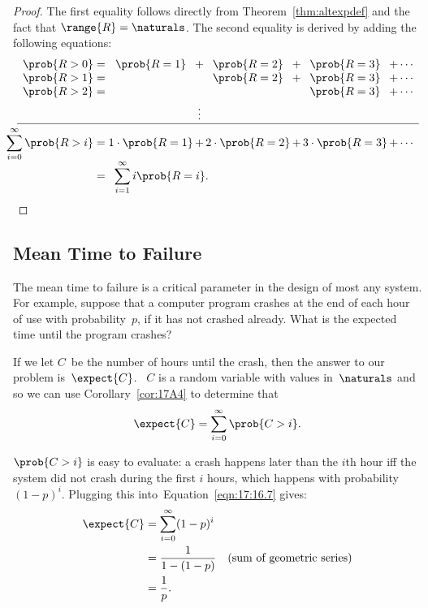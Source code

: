 \begin{proof}
The first equality follows directly from Theorem~\ref{thm:altexpdef}
and the fact that $\range{R} = \naturals$.  The second equality
is derived by adding the following equations:
\begin{equation*}
\begin{array}{c@{}r@{\;}c@{\;}c@{\,}c@{\,}c@{\,}c@{\,}c@{\,}c@{\,}c}
      & \prob{R > 0} &=&
            \prob{R = 1} &+& \prob{R = 2} &+& \prob{R = 3} &+& \cdots\\
      & \prob{R > 1} &=&
                         && \prob{R = 2} &+& \prob{R = 3} &+& \cdots\\
{}{} & \prob{R > 2} &=&
                         &&              && \prob{R = 3} &+&
            \cdots\\[\jot]
      & &&&\vdots \\
\hline\noalign{\vskip\jot}
      & \llap{$\displaystyle\sum_{i = 0}^\infty \prob{R > i}$} &=&
            1 \cdot \prob{R = 1} &+& 2 \cdot \prob{R = 2}
                &+& 3 \cdot \prob{R = 3} &+& \cdots\\[\jot]
      & &=& \multicolumn{7}{l}{\displaystyle\sum_{i = 1}^\infty i \prob{R = i}.}
\qedhere
\end{array}
\end{equation*}
\end{proof}

\subsection{Mean Time to Failure}\label{mean_time_to_failure_subsec}

The mean time to failure is a critical parameter in the design of most
any system.  For example, suppose that a computer program crashes at
the end of each hour of use with probability~$p$, if it has not
crashed already.  What is the expected time until the program crashes?

If we let $C$~be the number of hours until the crash, then the answer
to our problem is~$\expect{C}$.  \ $C$ is a random variable with values
in~$\naturals$ and so we can use Corollary~\ref{cor:17A4} to determine
that
\begin{equation}\label{eqn:17:16.7}
    \expect{C} = \sum_{i = 0}^\infty \prob{C > i}.
\end{equation}

$\prob{C > i}$ is easy to evaluate: a crash happens later than the
$i$th hour iff the system did not crash during the first $i$ hours,
which happens with probability $(1-p)^i$.  Plugging this
into~Equation~\ref{eqn:17:16.7} gives:
%
\begin{align}
\expect{C} & = \sum_{i = 0}^\infty (1-p)^i \notag\\
       & = \frac{1}{1 - (1-p)} & \text{(sum of geometric series)}\notag\\
       & = \frac{1}{p}. \label{eqn:17T10}
\end{align}

